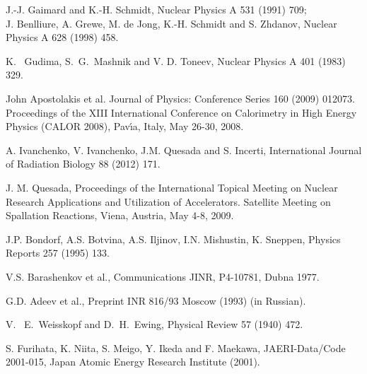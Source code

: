  J.-J. Gaimard and K.-H. Schmidt,
                        Nuclear Physics A 531 (1991) 709; \\
                        J. Benlliure, A. Grewe, M. de Jong, K.-H. Schmidt and
                        S. Zhdanov,
                        Nuclear Physics A 628 (1998) 458.

 K. ~Gudima, S.~G.~Mashnik and V. D. Toneev,
                          Nuclear Physics A 401 (1983) 329.

 John Apostolakis et al.
                            Journal of Physics: Conference Series 160 (2009) 012073.
  Proceedings of the XIII International Conference on Calorimetry in High Energy
  Physics (CALOR 2008), Pav\'{\i}a, Italy, May 26-30, 2008.

 A. Ivanchenko, V. Ivanchenko, J.M. Quesada and S. Incerti,
                                 International Journal of Radiation Biology 88 (2012) 171.

 J. M. Quesada, Proceedings of the International Topical Meeting on
                               Nuclear Research Applications and Utilization of Accelerators.
                               Satellite Meeting on Spallation Reactions, Viena, Austria, May 4-8, 2009.

 J.P. Bondorf, A.S. Botvina, A.S. Iljinov, I.N. Mishustin,
                                  K. Sneppen,
                                  Physics Reports 257 (1995) 133.

 V.S. Barashenkov et al.,
                               Communications JINR, P4-10781, Dubna 1977.

 G.D. Adeev et al.,
                              Preprint INR 816/93 Moscow (1993) (in Russian).

 V. ~E.~Weisskopf and D.~H.~Ewing,
                                Physical Review 57 (1940) 472.

 S. Furihata, K. Niita, S. Meigo, Y. Ikeda and
                          F. Maekawa,
                          JAERI-Data/Code 2001-015, Japan Atomic Energy Research Institute (2001).


